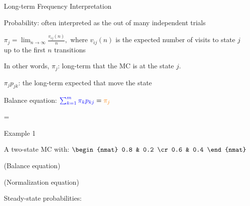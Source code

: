 \begin{frame}{Long-term Frequency Interpretation}

{
\small
  \plitemsep 0.1in
\bci

\item Probability: often interpreted as the  out
  of many independent trials

\item   $\displaystyle \pi_j = \lim_{n \rightarrow \infty}
  \frac{v_{ij}(n)}{n},$ where $v_{ij}(n)$ is the expected number of
  visits to state $j$ up to the first $n$ transitions

\item In other words, $\pi_j$: long-term  that the MC is at the state $j.$

\item $\pi_j p_{jk}$: the long-term expected 
  that move the state 



  \eci

}
{
\small
     \plitemsep 0.1in
 \bci
\item Balance equation: ${\color{blue} \sum_{k=1}^m \pi_k p_{kj}} = {\color{orange} \pi_j}$

\bci
\item  {}
  =

\eci

 \eci
  \vspace{-0.2cm}
}

\end{frame}



\begin{frame}{Example 1}

\plitemsep 0.1in
\bci

\item A two-state MC with:
  $
  \begin{nmat}
    0.8 & 0.2 \cr
    0.6 & 0.4 
  \end{nmat}
  $

\item (Balance equation) 
\item (Normalization equation) 

\item Steady-state probabilities: 

\eci
\end{frame}


